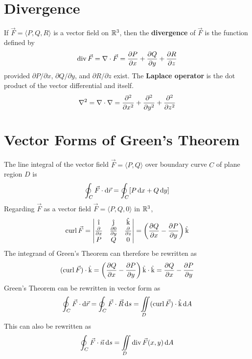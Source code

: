 \documentclass[./Calculus \Roman{3}.tex]{subfiles}
\begin{document}
		\section*{Divergence}
			If $\vec{F} = \langle P, Q, R \rangle$ is a vector field on $\mathbb{R}^3$, then the \textbf{divergence} of $\vec{F}$ is the function defined by
				\[\operatorname{div} \vec{F} = \nabla \cdot \vec{F} = \frac{\partial P}{\partial x} + \frac{\partial Q}{\partial y} + \frac{\partial R}{\partial z}\]
				provided $\partial P/\partial x$, $\partial Q/\partial y$, and $\partial R/ \partial z$ exist.
			The \textbf{Laplace operator} is the dot product of the vector differential and itself.
				\[\nabla^2 = \nabla \cdot \nabla = \frac{\partial ^2}{\partial x^2} + \frac{\partial ^2}{\partial y^2} + \frac{\partial ^2}{\partial z^2}\]
		\section*{Vector Forms of Green's Theorem}
			The line integral of the vector field $\vec{F} = \langle P, Q \rangle$ over boundary curve $C$ of plane region $D$ is
				\[\oint_C \vec{F} \cdot \mathrm{d}\vec{r} = \oint_C[P\,\mathrm{d} x + Q\,\mathrm{d} y]\]
				Regarding $\vec{F}$ as a vector field $\vec{F} = \langle P, Q, 0 \rangle$ in $\mathbb{R}^3$,
				\[
					\curl \vec{F} =
						\begin{vmatrix}
							\vi & \vj & \vk \\
							\pder{}{x} & \pder{0}{y} & \pder{}{z} \\
							P & Q & 0
						\end{vmatrix}
						= \left(\pder{Q}{x} - \pder{P}{y}\right)\vk
				\]
				The integrand of Green's Theorem can therefore be rewritten as
				\[(\operatorname{curl}\vec{F}) \cdot \text{\^k} = \left(\frac{\partial Q}{\partial x} - \frac{\partial P}{\partial y}\right)\text{\^k} \cdot \text{\^k} = \frac{\partial Q}{\partial x} - \frac{\partial P}{\partial y}\]
				Green's Theorem can be rewritten in vector form as
				\[\oint_C \vec{F} \cdot \mathrm{d}\vec{r} = \oint_C \vec{F} \cdot \vec{R}\,\mathrm{d} s = \iint\limits_D (\operatorname{curl}\vec{F}) \cdot \text{\^k} \,\mathrm{d} A\]
				This can also be rewritten as
				\[\oint_C \vec{F} \cdot \vec{n} \,\mathrm{d} s = \iint\limits_D \operatorname{div}\vec{F}(x, y)\,\mathrm{d} A\]
\end{document}
